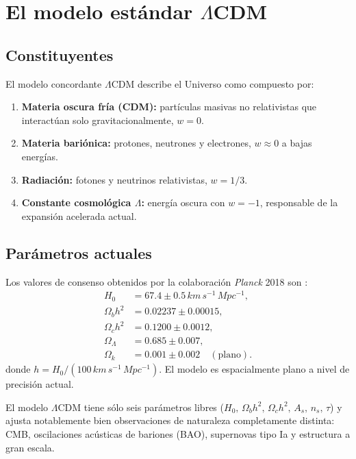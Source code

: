 \section{El modelo estándar $\Lambda$CDM}
\label{sec:lambdacdm}

\subsection{Constituyentes}

El modelo concordante $\Lambda$CDM describe el Universo como compuesto por:
\begin{enumerate}[leftmargin=2em, label=\textbf{\arabic*.}]
  \item \textbf{Materia oscura fría (CDM):} partículas masivas no relativistas que interactúan solo gravitacionalmente, $w=0$.
  \item \textbf{Materia bariónica:} protones, neutrones y electrones, $w\approx0$ a bajas energías.
  \item \textbf{Radiación:} fotones y neutrinos relativistas, $w=1/3$.
  \item \textbf{Constante cosmológica $\Lambda$:} energía oscura con $w=-1$, responsable de la expansión acelerada actual.
\end{enumerate}

\subsection{Parámetros actuales}

Los valores de consenso obtenidos por la colaboración \textit{Planck} 2018 son \cite{Planck2020}:
\begin{align}
  H_0 &= 67.4\pm0.5\,\si{km\,s^{-1}\,Mpc^{-1}}, \label{eq:H0_planck}\\
  \Omega_b h^2 &= 0.02237\pm0.00015, \label{eq:omegab}\\
  \Omega_c h^2 &= 0.1200\pm0.0012, \label{eq:omegac}\\
  \Omega_\Lambda &= 0.685\pm0.007, \label{eq:omegaL}\\
  \Omega_k &= 0.001\pm0.002\quad(\text{plano}). \label{eq:omegak}
\end{align}
donde $h=H_0/(100\,\si{km\,s^{-1}\,Mpc^{-1}})$. El modelo es espacialmente plano a nivel de precisión actual.

\begin{importante}
El modelo $\Lambda$CDM tiene sólo seis parámetros libres ($H_0,\,\Omega_b h^2,\,\Omega_c h^2,\,A_s,\,n_s,\,\tau$) y ajusta notablemente bien observaciones de naturaleza completamente distinta: CMB, oscilaciones acústicas de bariones (BAO), supernovas tipo Ia y estructura a gran escala.
\end{importante}

